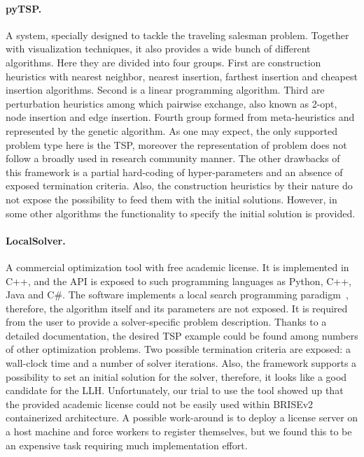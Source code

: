 \paragraph{pyTSP.} A system, specially designed to tackle the traveling salesman problem. Together with visualization techniques, it also provides a wide bunch of different algorithms. Here they are divided into four groups. First are construction heuristics with nearest neighbor, nearest insertion, farthest insertion and cheapest insertion algorithms. Second is a linear programming algorithm. Third are perturbation heuristics among which pairwise exchange, also known as 2-opt, node insertion and edge insertion. Fourth group formed from meta-heuristics and represented by the genetic algorithm. As one may expect, the only supported problem type here is the TSP, moreover the representation of problem does not follow a broadly used in research community manner. The other drawbacks of this framework is a partial hard-coding of hyper-parameters and an absence of exposed termination criteria. Also, the construction heuristics by their nature do not expose the possibility to feed them with the initial solutions. However, in some other algorithms the functionality to specify the initial solution is provided.

\paragraph{LocalSolver.} A commercial optimization tool with free academic license. It is implemented in C++, and the API is exposed to such programming languages as Python, C++, Java and C\#. The software implements a local search programming paradigm~\cite{benoist2010toward,benoist2011localsolver}, therefore, the algorithm itself and its parameters are not exposed. It is required from the user to provide a solver-specific problem description. Thanks to a detailed documentation, the desired TSP example could be found among numbers of other optimization problems. Two possible termination criteria are exposed: a wall-clock time and a number of solver iterations. Also, the framework supports a possibility to set an initial solution for the solver, therefore, it looks like a good candidate for the LLH. Unfortunately, our trial to use the tool showed up that the provided academic license could not be easily used within BRISEv2 containerized architecture. A possible work-around is to deploy a license server on a host machine and force workers to register themselves, but we found this to be an expensive task requiring much implementation effort.

